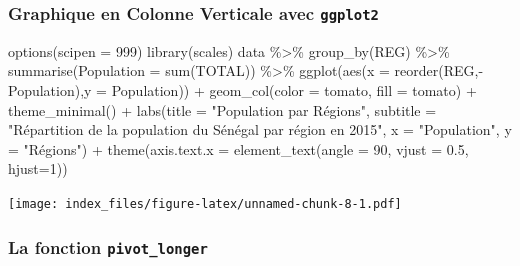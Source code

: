 \documentclass[
]{article}
\newenvironment{Shaded}{\begin{snugshade}}{\end{snugshade}}
\newcommand{\AttributeTok}[1]{\textcolor[rgb]{0.77,0.63,0.00}{#1}}
\newcommand{\DecValTok}[1]{\textcolor[rgb]{0.00,0.00,0.81}{#1}}
\newcommand{\FloatTok}[1]{\textcolor[rgb]{0.00,0.00,0.81}{#1}}
\newcommand{\FunctionTok}[1]{\textcolor[rgb]{0.00,0.00,0.00}{#1}}
\newcommand{\NormalTok}[1]{#1}
\newcommand{\SpecialCharTok}[1]{\textcolor[rgb]{0.00,0.00,0.00}{#1}}
\newcommand{\StringTok}[1]{\textcolor[rgb]{0.31,0.60,0.02}{#1}}
\begin{document}
\hypertarget{graphique-en-colonne-verticale-avec-ggplot2}{%
\subsubsection{\texorpdfstring{Graphique en Colonne Verticale avec
\texttt{ggplot2}}{Graphique en Colonne Verticale avec ggplot2}}\label{graphique-en-colonne-verticale-avec-ggplot2}}

\begin{Shaded}
\begin{Highlighting}[]
\FunctionTok{options}\NormalTok{(}\AttributeTok{scipen =} \DecValTok{999}\NormalTok{)}
\FunctionTok{library}\NormalTok{(scales)}
\NormalTok{data }\SpecialCharTok{\%\textgreater{}\%} 
  \FunctionTok{group\_by}\NormalTok{(REG) }\SpecialCharTok{\%\textgreater{}\%} 
  \FunctionTok{summarise}\NormalTok{(}\AttributeTok{Population =} \FunctionTok{sum}\NormalTok{(TOTAL)) }\SpecialCharTok{\%\textgreater{}\%} 
  \FunctionTok{ggplot}\NormalTok{(}\FunctionTok{aes}\NormalTok{(}\AttributeTok{x =} \FunctionTok{reorder}\NormalTok{(REG,}\SpecialCharTok{{-}}\NormalTok{Population),}\AttributeTok{y =}\NormalTok{  Population)) }\SpecialCharTok{+}
  \FunctionTok{geom\_col}\NormalTok{(}\AttributeTok{color =} \StringTok{\textquotesingle{}tomato\textquotesingle{}}\NormalTok{, }\AttributeTok{fill =} \StringTok{\textquotesingle{}tomato\textquotesingle{}}\NormalTok{) }\SpecialCharTok{+}
  \FunctionTok{theme\_minimal}\NormalTok{() }\SpecialCharTok{+}
  \FunctionTok{labs}\NormalTok{(}\AttributeTok{title =} \StringTok{"Population par Régions"}\NormalTok{,}
       \AttributeTok{subtitle =} \StringTok{"Répartition de la population du Sénégal par région en 2015"}\NormalTok{,}
       \AttributeTok{x =} \StringTok{"Population"}\NormalTok{,}
       \AttributeTok{y =} \StringTok{"Régions"}\NormalTok{) }\SpecialCharTok{+}
  \FunctionTok{theme}\NormalTok{(}\AttributeTok{axis.text.x =} \FunctionTok{element\_text}\NormalTok{(}\AttributeTok{angle =} \DecValTok{90}\NormalTok{, }\AttributeTok{vjust =} \FloatTok{0.5}\NormalTok{, }\AttributeTok{hjust=}\DecValTok{1}\NormalTok{))}
\end{Highlighting}
\end{Shaded}

\texttt{[image: index\_files/figure-latex/unnamed-chunk-8-1.pdf]}

\hypertarget{la-fonction-pivot_longer}{%
\subsubsection{\texorpdfstring{La fonction
\texttt{pivot\_longer}}{La fonction pivot\_longer}}\label{la-fonction-pivot_longer}}
\end{document}

